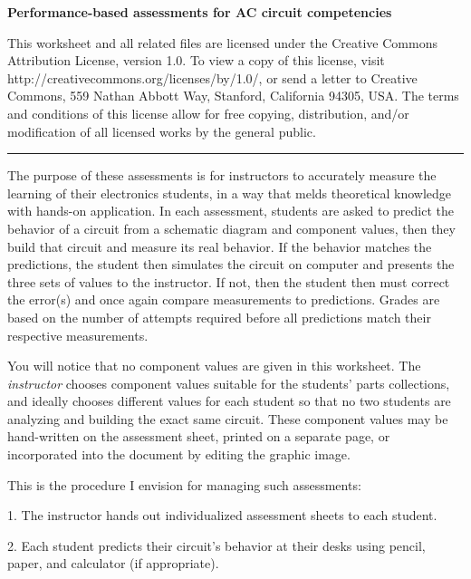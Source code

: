 
\centerline{\bf Performance-based assessments for AC circuit competencies} \bigskip 
 
This worksheet and all related files are licensed under the Creative Commons Attribution License, version 1.0.  To view a copy of this license, visit http://creativecommons.org/licenses/by/1.0/, or send a letter to Creative Commons, 559 Nathan Abbott Way, Stanford, California 94305, USA.  The terms and conditions of this license allow for free copying, distribution, and/or modification of all licensed works by the general public.

\bigskip 

\hrule

\vskip 10pt

The purpose of these assessments is for instructors to accurately measure the learning of their electronics students, in a way that melds theoretical knowledge with hands-on application.  In each assessment, students are asked to predict the behavior of a circuit from a schematic diagram and component values, then they build that circuit and measure its real behavior.  If the behavior matches the predictions, the student then simulates the circuit on computer and presents the three sets of values to the instructor.  If not, then the student then must correct the error(s) and once again compare measurements to predictions.  Grades are based on the number of attempts required before all predictions match their respective measurements.

You will notice that no component values are given in this worksheet.  The {\it instructor} chooses component values suitable for the students' parts collections, and ideally chooses different values for each student so that no two students are analyzing and building the exact same circuit.  These component values may be hand-written on the assessment sheet, printed on a separate page, or incorporated into the document by editing the graphic image.

\vskip 10pt

\noindent
This is the procedure I envision for managing such assessments:

\vskip 10pt

\item{1.} The instructor hands out individualized assessment sheets to each student.

\item{2.} Each student predicts their circuit's behavior at their desks using pencil, paper, and calculator (if appropriate).

